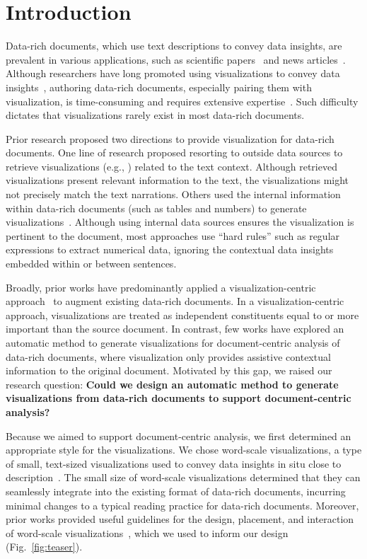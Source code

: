 \section{Introduction}
Data-rich documents, which use text descriptions to convey data insights, are prevalent in various applications, such as scientific papers~\cite{beck2017wordsized} and news articles~\cite{lin2018vizbywiki}.
Although researchers have long promoted using visualizations to convey data insights~\cite{washburne1927experimental, costigan-eaves1986edward}, authoring data-rich documents, especially pairing them with visualization, is time-consuming and requires extensive expertise~\cite{chen2022crossdata}. Such difficulty dictates that visualizations rarely exist in most data-rich documents.

Prior research proposed two directions to provide visualization for data-rich documents. One line of research proposed resorting to outside data sources to retrieve visualizations (e.g., \cite{lin2018vizbywiki, metoyer2018Coupling}) related to the text context. Although retrieved visualizations present relevant information to the text, the visualizations might not precisely match the text narrations. Others used the internal information within data-rich documents (such as tables and numbers) to generate visualizations~\cite{masson2023Charagraph, badam2019elastic, cui2020texttoviz}. Although using internal data sources ensures the visualization is pertinent to the document, most approaches use ``hard rules'' such as regular expressions to extract numerical data, ignoring the contextual data insights embedded within or between sentences.

Broadly, prior works have predominantly applied a visualization-centric approach~\cite{goffin2020Interaction} to augment existing data-rich documents. In a visualization-centric approach, visualizations are treated as independent constituents equal to or more important than the source document. In contrast, few works have explored an automatic method to generate visualizations for document-centric analysis of data-rich documents, where visualization only provides assistive contextual information to the original document. Motivated by this gap, we raised our research question: \textbf{Could we design an automatic method to generate visualizations from data-rich documents to support document-centric analysis?}

Because we aimed to support document-centric analysis, we first determined an appropriate style for the visualizations. We chose word-scale visualizations, a type of small, text-sized visualizations used to convey data insights in situ close to description~\cite{goffin2014exploring}. The small size of word-scale visualizations determined that they can seamlessly integrate into the existing format of data-rich documents, incurring minimal changes to a typical reading practice for data-rich documents. Moreover, prior works provided useful guidelines for the design, placement, and interaction of word-scale visualizations~\cite{goffin2015exploring, goffin2017Exploratory, goffin2020Interaction}, which we used to inform our design (Fig.~\ref{fig:teaser}).

